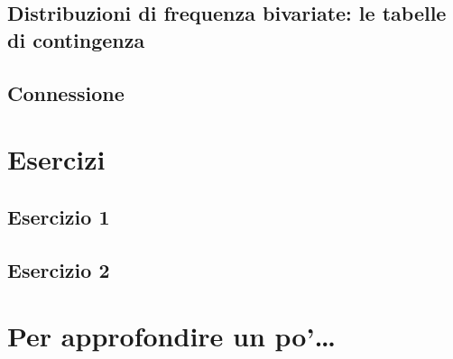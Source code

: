 \documentclass[a4paper,12pt,oneside]{book}
\begin{document}
\hypertarget{distribuzioni-di-frequenza-bivariate-le-tabelle-di-contingenza}{%
\subsection*{Distribuzioni di frequenza bivariate: le tabelle di contingenza}\label{distribuzioni-di-frequenza-bivariate-le-tabelle-di-contingenza}}

\hypertarget{connessione}{%
\subsection*{Connessione}\label{connessione}}

\hypertarget{esercizi-2}{%
\section*{Esercizi}\label{esercizi-2}}

\hypertarget{esercizio-1}{%
\subsection*{Esercizio 1}\label{esercizio-1}}

\hypertarget{esercizio-2}{%
\subsection*{Esercizio 2}\label{esercizio-2}}

\hypertarget{per-approfondire-un-po-11}{%
\section{Per approfondire un po'\ldots{}}\label{per-approfondire-un-po-11}}
\end{document}
